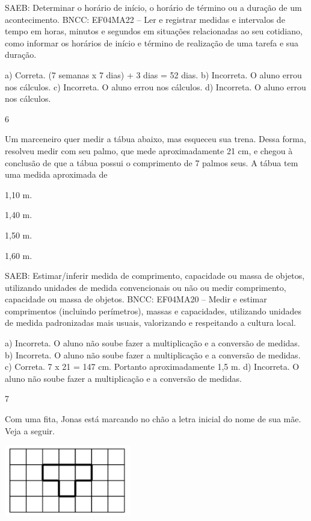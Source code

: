 \begin{mdframed}[linewidth=2pt,linecolor=salmao,roundcorner=2pt]
\begin{escolha}
{\begin{escolha}
SAEB: Determinar o horário de início, o horário de término ou
a duração de um acontecimento.
BNCC: EF04MA22 -- Ler e registrar medidas e intervalos de tempo em horas, minutos e segundos em
situações relacionadas ao seu cotidiano, como informar os horários de início e término de realização
de uma tarefa e sua duração.

a) Correta. (7 semanas x 7 dias) + 3 dias = 52 dias.
b) Incorreta. O aluno errou nos cálculos.
c) Incorreta. O aluno errou nos cálculos.
d) Incorreta. O aluno errou nos cálculos.

\num{6}

Um marceneiro quer medir a tábua abaixo, mas esqueceu sua trena. Dessa
forma, resolveu medir com seu palmo, que mede aproximadamente 21 cm, e
chegou à conclusão de que a tábua possui o comprimento
de 7 palmos seus. A tábua tem uma medida aproximada de

\begin{escolha}
\item
  1,10 m.
\item
  1,40 m.
\item
  1,50 m.
\item
  1,60 m.
\end{escolha}

SAEB: Estimar/inferir medida de comprimento, capacidade ou
massa de objetos, utilizando unidades de medida convencionais ou não ou
medir comprimento, capacidade ou massa de objetos.
BNCC: EF04MA20 -- Medir e estimar comprimentos (incluindo perímetros), massas e capacidades, utilizando
unidades de medida padronizadas mais usuais, valorizando e respeitando a cultura local.

a) Incorreta. O aluno não soube fazer a multiplicação e a conversão de medidas.
b) Incorreta. O aluno não soube fazer a multiplicação e a conversão de medidas.
c) Correta. 7 x 21 = 147 cm. Portanto aproximadamente 1,5 m.
d) Incorreta. O aluno não soube fazer a multiplicação e a conversão de medidas.

\num{7}

Com uma fita, Jonas está marcando no chão a letra inicial do nome de
sua mãe. Veja a seguir.

\includegraphics[width=2.17519in,height=1.22511in]{media/image155.png}


\end{escolha}}
\end{escolha}
\end{mdframed}
